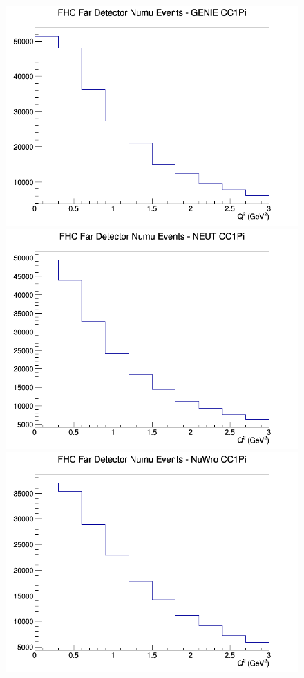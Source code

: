 \begin{figure}[h]
\endminipage
\newline
{}
\includegraphics[width=\linewidth]{Q2/nominal/CC1Pi_FHC_FD_numu_Q2_GENIE.png}
\endminipage
{}
\includegraphics[width=\linewidth]{Q2/nominal/CC1Pi_FHC_FD_numu_Q2_NEUT.png}
\endminipage
{}
\includegraphics[width=\linewidth]{Q2/nominal/CC1Pi_FHC_FD_numu_Q2_NuWro.png}

\end{figure}
